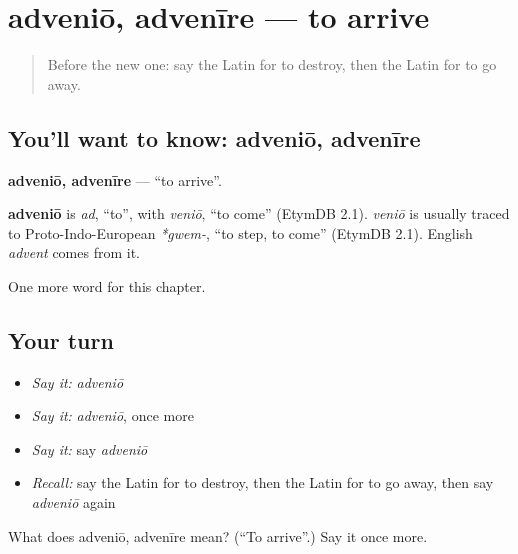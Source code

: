 \section[adveniō, advenīre]{adveniō, advenīre — to arrive}

\label{lesson:LA-C160-advenio}



\begin{quote}
Before the new one: say the Latin for to destroy, then the Latin for to go away.
\end{quote}

\subsection*{You'll want to know: adveniō, advenīre}
\textbf{adveniō, advenīre} — \textquotedblleft{}to arrive\textquotedblright{}.

\begin{cousinweb}
\textbf{adveniō} is \emph{ad}, \textquotedblleft{}to\textquotedblright{}, with \emph{veniō}, \textquotedblleft{}to come\textquotedblright{} (EtymDB 2.1). \emph{veniō} is usually traced to Proto-Indo-European \emph{*gwem-}, \textquotedblleft{}to step, to come\textquotedblright{} (EtymDB 2.1). English \emph{advent} comes from it.
\end{cousinweb}

\begin{grammarlens}[title={What you've built}]
One more word for this chapter.
\end{grammarlens}

\subsection*{Your turn}
\begin{itemize}
\raggedright
  \item \emph{Say it:} \emph{adveniō}
  \item \emph{Say it:} \emph{adveniō}, once more
  \item \emph{Say it:} say \emph{adveniō}
  \item \emph{Recall:} say the Latin for to destroy, then the Latin for to go away, then say \emph{adveniō} again
\end{itemize}

\begin{tcolorbox}[breakable,colback=teal!4,colframe=teal!35!black,title={Before you move on}]
What does adveniō, advenīre mean? (\textquotedblleft{}To arrive\textquotedblright{}.) Say it once more.
\end{tcolorbox}
